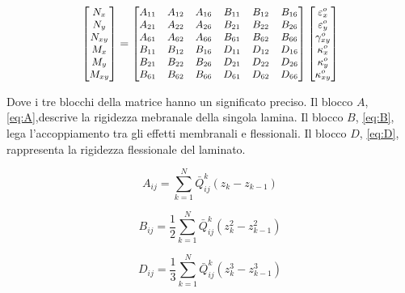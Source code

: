 \documentclass[a4paper,num-refs]{oup-contemporary}
\begin{document}
\begin{equation}
	\small{
\left[\begin{matrix}
	N_{x} \\
	N_{y} \\
	N_{x y} \\
	M_{x} \\
	M_{y} \\
	M_{x y}
\end{matrix}\right]=\left[\begin{matrix}
	A_{11} & A_{12} & A_{16} & B_{11} & B_{12} & B_{16} \\
	A_{21} & A_{22} & A_{26} & B_{21} & B_{22} & B_{26} \\
	A_{61} & A_{62} & A_{66} & B_{61} & B_{62} & B_{66} \\
 B_{11} & B_{12} & B_{16} & D_{11} & D_{12} & D_{16} \\
	B_{21} & B_{22} & B_{26} & D_{21} & D_{22} & D_{26} \\
	B_{61} & B_{62} & B_{66} & D_{61} & D_{62} & D_{66}
\end{matrix}\right]\left[\begin{matrix}
	\varepsilon_{x}^{o} \\
	\varepsilon_{y}^{o} \\
	\gamma_{x y}^{o} \\
	\kappa_{x}^{o} \\
	\kappa_{y}^{o} \\
	\kappa_{x y}^{o}
\end{matrix}\right]}
\label{eq:constitutive}
\end{equation}

Dove i tre blocchi della matrice hanno un significato preciso. Il blocco $A$, \cref{eq:A},descrive la rigidezza mebranale della singola lamina. Il blocco $B$, \cref{eq:B}, lega l'accoppiamento tra gli effetti membranali e flessionali. Il blocco $D$, \cref{eq:D}, rappresenta la rigidezza flessionale del laminato.


\begin{equation}
A_{i j}=\sum_{k=1}^{N} \bar{Q}_{i j}^{k}\left(z_{k}-z_{k-1}\right)
\label{eq:A}
\end{equation}

\begin{equation}
B_{i j}=\frac{1}{2} \sum_{k=1}^{N} \bar{Q}_{i j}^{k}\left(z_{k}^{2}-z_{k-1}^{2}\right)
\label{eq:B}
\end{equation}

\begin{equation}
D_{i j}=\frac{1}{3} \sum_{k=1}^{N} \bar{Q}_{i j}^{k}\left(z_{k}^{3}-z_{k-1}^{3}\right)
\label{eq:D}
\end{equation}
\end{document}
